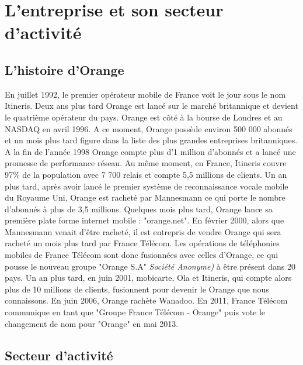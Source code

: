 \chapter{L'entreprise et son secteur d'activité}
\label{chap:premierchapitre}

\section{L'histoire d'Orange}


En juillet 1992, le premier opérateur mobile  de France voit le jour sous le nom Itineris. Deux ans plus tard Orange est lancé sur le marché britannique et devient le quatrième opérateur du pays. Orange est côté à la bourse de Londres et au NASDAQ en avril 1996. A ce moment, Orange possède environ 500 000 abonnés et un mois plus tard figure dans la liste des plus grandes entreprises britanniques. A la fin de l'année 1998 Orange compte plus d'1 million d'abonnés et a lancé une promesse de performance réseau. Au même moment, en France, Itineris couvre 97\% de la population avec 7 700 relais et compte 5,5 millions de clients. Un an plus tard, après avoir lancé le premier système de reconnaissance vocale mobile du Royaume Uni, Orange est racheté par Mannesmann ce qui porte le nombre d'abonnés à plus de 3,5 millions. Quelques mois plus tard, Orange lance sa première plate forme internet mobile : "orange.net". En février 2000, alors que Mannesmann venait d'être racheté, il est entrepris de vendre Orange qui sera racheté un mois plus tard par France Télécom. Les opérations de téléphonies mobiles de France Télécom sont donc fusionnées avec celles d'Orange, ce qui pousse le nouveau groupe "Orange S.A" \textit{Société Anonyme)} à être présent dans 20 pays. Un an plus tard, en juin 2001, mobicarte, Ola et Itineris, qui compte alors plus de 10 millions de clients, fusionnent pour devenir le Orange que nous connaissons. En juin 2006, Orange rachète Wanadoo. En 2011, France Télécom communique en tant que "Groupe France Télécom - Orange" puis vote le changement de nom pour "Orange" en mai 2013.



\section{Secteur d'activité}

